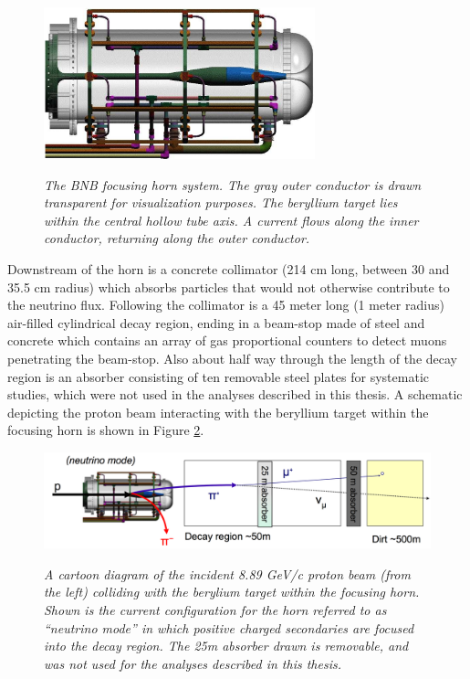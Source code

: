 \begin{figure}[ht!]
\centering
	\includegraphics[width=0.7\textwidth]{Figures/BNB_horn_schematic.png} \\
\caption{\textit{The BNB focusing horn system. The gray outer conductor is drawn transparent for visualization purposes. The beryllium target lies within the central hollow tube axis. A current flows along the inner conductor, returning along the outer conductor.}}\label{BNB_horn_schematic}
\end{figure}

Downstream of the horn is a concrete collimator (214 cm long, between 30 and 35.5 cm radius) which absorbs particles that would not otherwise contribute to the neutrino flux. Following the collimator is a 45 meter long (1 meter radius) air-filled cylindrical decay region, ending in a beam-stop made of steel and concrete which contains an array of gas proportional counters to detect muons penetrating the beam-stop. Also about half way through the length of the decay region is an absorber consisting of ten removable steel plates for systematic studies, which were not used in the analyses described in this thesis. A schematic depicting the proton beam interacting with the beryllium target within the focusing horn is shown in Figure \ref{BNB_numode_fig}.

\begin{figure}[ht!]
\centering
	\includegraphics[width=1.0\textwidth]{Figures/BNB_numode_fig.png} \\
\caption{\textit{A cartoon diagram of the incident 8.89 GeV/c proton beam (from the left) colliding with the berylium target within the focusing horn. Shown is the current configuration for the horn referred to as ``neutrino mode'' in which positive charged secondaries are focused into the decay region. The 25m absorber drawn is removable, and was not used for the analyses described in this thesis.}}\label{BNB_numode_fig}
\end{figure}



